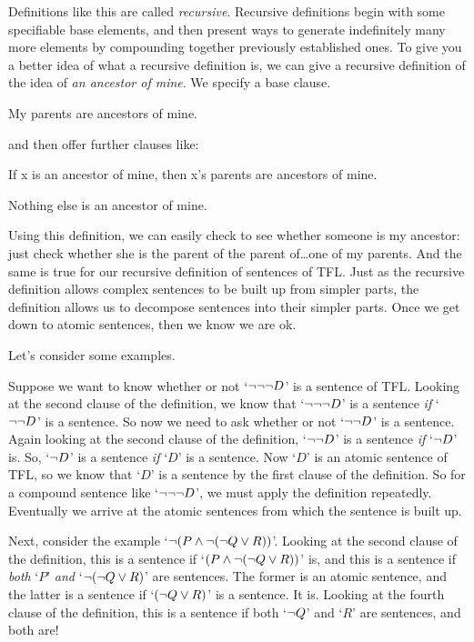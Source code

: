 Definitions like this are called \emph{recursive}. Recursive definitions begin with some specifiable base elements, and then present ways to generate indefinitely many more elements by compounding together previously established ones. To give you a better idea of what a recursive definition is, we can give a recursive definition of the idea of \emph{an ancestor of mine}. We specify a base clause.
	\begin{ebullet}
		\item My parents are ancestors of mine.
	\end{ebullet}
and then offer further clauses like:
	\begin{ebullet}
		\item If x is an ancestor of mine, then x's parents are ancestors of mine.
		\item Nothing else is an ancestor of mine.
	\end{ebullet}
Using this definition, we can easily check to see whether someone is my ancestor: just check whether she is the parent of the parent of\ldots one of my parents. And the same is true for our recursive definition of sentences of TFL. Just as the recursive definition allows complex sentences to be built up from simpler parts, the definition allows us to decompose sentences into their simpler parts. Once we get down to atomic sentences, then we know we are ok. 

Let's consider some examples.

Suppose we want to know whether or not `$\neg \neg \neg D$' is a sentence of TFL. Looking at the second clause of the definition, we know that `$\neg \neg \neg D$' is a sentence \emph{if} `$\neg \neg D$' is a sentence. So now we need to ask whether or not `$\neg \neg D$' is a sentence. Again looking at the second clause of the definition, `$\neg \neg D$' is a sentence \emph{if} `$\neg D$' is. So, `$\neg D$' is a sentence \emph{if} `$D$' is a sentence. Now `$D$' is an atomic sentence of TFL, so we know that `$D$' is a sentence by the first clause of the definition. So for a compound sentence like `$\neg \neg \neg D$', we must apply the definition repeatedly. Eventually we arrive at the atomic sentences from which the sentence is built up.

Next, consider the example `$\neg (P \wedge \neg (\neg Q \vee R))$'. Looking at the second clause of the definition, this is a sentence if `$(P \wedge \neg (\neg Q \vee R))$' is, and this is a sentence if \emph{both} `$P$' \emph{and} `$\neg (\neg Q \vee R)$' are sentences. The former is an atomic sentence, and the latter is a sentence if `$(\neg Q \vee R)$' is a sentence. It is. Looking at the fourth clause of the definition, this is a sentence if both `$\neg Q$' and `$R$' are sentences, and both are!

